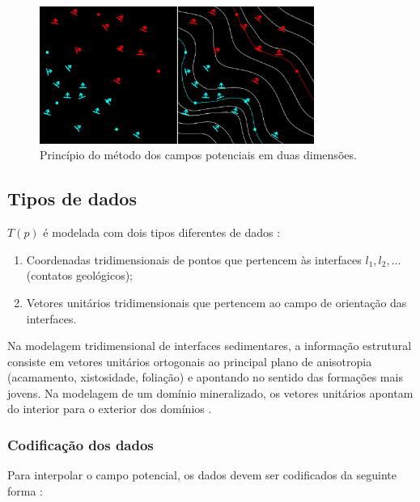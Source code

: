 \begin{figure}[!htb]
	\caption{\label{pot_field_1}Princípio do método dos campos potenciais em duas dimensões.}
	\begin{center}
		\includegraphics[width=0.8\textwidth]{revisao_bibliografica/pot_field_1}
	\end{center}
\end{figure}

\subsection{Tipos de dados}

$T(p)$ é modelada com dois tipos diferentes de dados \cite{chiles2004modelling}:

\begin{enumerate}
\item Coordenadas tridimensionais de pontos que pertencem às interfaces $l_1, l_2, ...$ (contatos geológicos);
\item Vetores unitários tridimensionais que pertencem ao campo de orientação das interfaces.  
\end{enumerate}

Na modelagem tridimensional de interfaces sedimentares, a informação estrutural consiste em vetores unitários ortogonais ao principal plano de anisotropia (acamamento, xistosidade, foliação) e apontando no sentido das formações mais jovens. Na modelagem de um domínio mineralizado, os vetores unitários apontam do interior para o exterior dos domínios \cite{renard2013modeling}.

\subsubsection{Codificação dos dados}

Para interpolar o campo potencial, os dados devem ser codificados da seguinte forma \cite{chiles2004modelling, calcagno2008geological, renard2013modeling}:


